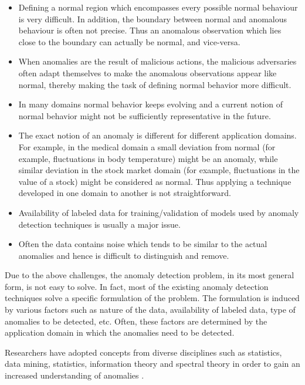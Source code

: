 \begin{itemize}

\item Defining a normal region which encompasses every possible normal behaviour 
is very difficult. In addition, the boundary between normal and anomalous 
behaviour is often not precise. Thus an anomalous observation which lies close
to the boundary can actually be normal, and vice-versa.

\item When anomalies are the result of malicious actions, the malicious 
adversaries often adapt themselves to make the anomalous observations appear 
like normal, thereby making the task of defining normal behavior more difficult.

\item In many domains normal behavior keeps evolving and a current notion of
normal behavior might not be sufficiently representative in the future.

\item The exact notion of an anomaly is different for different application 
domains. For example, in the medical domain a small deviation from normal (for
example, fluctuations in body temperature) might be an anomaly, while similar 
deviation in the stock market domain (for example, fluctuations in the value of 
a stock) might be considered as normal. Thus applying a technique developed in 
one domain to another is not straightforward.

\item Availability of labeled data for training/validation of models used by 
anomaly detection techniques is usually a major issue.

\item Often the data contains noise which tends to be similar to the actual 
anomalies and hence is difficult to distinguish and remove.

\end{itemize}

Due to the above challenges, the anomaly detection problem, in its most general
form, is not easy to solve. In fact, most of the existing anomaly detection 
techniques solve a specific formulation of the problem. The formulation is 
induced by various factors such as nature of the data, availability of labeled 
data, type of anomalies to be detected, etc. Often, these factors are determined
by the application domain in which the anomalies need to be detected.

Researchers have adopted concepts from diverse disciplines such as statistics, 
data mining, statistics, information theory and spectral theory in order to gain
an increased understanding of anomalies \cite{Chandola:2007}.

